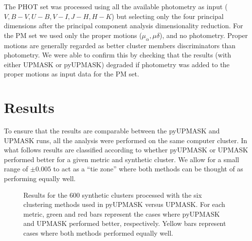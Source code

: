 \documentclass[draft]{aa}
\begin{document}

 The PHOT set was processed using all the available photometry as input ($V,
 B-V, U-B, V-I, J-H, H-K$) but selecting only the four principal dimensions
 after the principal component analysis dimensionality reduction.
 For the PM set we used only the proper motions ($\mu_{\alpha}, \mu{\delta}$),
 and no photometry. Proper motions are generally regarded as better cluster
 members discriminators than photometry. We were able to confirm this by
 checking that the results (with either UPMASK or pyUPMASK) degraded if
 photometry was added to the proper motions as input data for the PM set.




\section{Results}
 \label{sec:results}

 To ensure that the results are comparable between the pyUPMASK and UPMASK runs,
 all the analysis were performed on the same computer cluster. In what follows
 results are classified according to whether pyUPMASK or UPMASK performed
 better for a given metric and synthetic cluster.
 We allow for a small range of $\pm0.005$ to act as a ``tie zone''
 where both methods can be thought of as performing equally well.\\

 \begin{figure}
 \caption{Results for the 600 synthetic clusters processed with the six
 clustering methods used in pyUPMASK versus UPMASK. For each metric, green and
 red bars represent the cases where pyUPMASK and UPMASK performed better,
 respectively. Yellow bars represent cases where both methods performed
 equally well.}
 \label{fig:allmethods}
 \end{figure}
\end{document}
